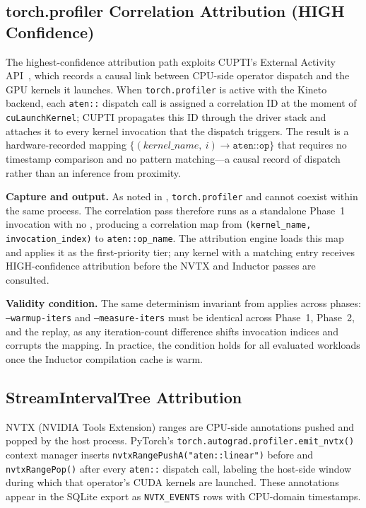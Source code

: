 \subsection{torch.profiler Correlation Attribution (HIGH Confidence)}
\label{sec:tprofiler}

The highest-confidence attribution path exploits CUPTI's External Activity API~\cite{cupti2024}, which records a
causal link between CPU-side operator dispatch and the GPU kernels it launches.  When
\texttt{torch.profiler} is active with the Kineto backend, each \texttt{aten::} dispatch call is
assigned a correlation ID at the moment of \texttt{cuLaunchKernel}; CUPTI propagates this ID
through the driver stack and attaches it to every kernel invocation that the dispatch triggers.
The result is a hardware-recorded mapping
$\{(\textit{kernel\_name},\ i) \to \texttt{aten::op}\}$ that requires no timestamp comparison
and no pattern matching---a causal record of dispatch rather than an inference from proximity.

\textbf{Capture and output.}  As noted in , \texttt{torch.profiler} and
\nsys cannot coexist within the same process.  The correlation pass therefore runs as a standalone
Phase~1 invocation with no \nsys, producing a correlation map from
\texttt{(kernel\_name, invocation\_index)} to \texttt{aten::op\_name}.
The attribution engine loads this map and applies it as the first-priority tier;
any kernel with a matching entry receives HIGH-confidence attribution before the NVTX and
Inductor passes are consulted.

\textbf{Validity condition.}  The same determinism invariant from 
applies across phases: \texttt{--warmup-iters} and \texttt{--measure-iters} must be identical
across Phase~1, Phase~2, and the \ncu replay, as any iteration-count difference shifts
invocation indices and corrupts the mapping.  In practice, the condition holds for all
evaluated workloads once the Inductor compilation cache is warm.

\subsection{StreamIntervalTree Attribution}
\label{sec:intervaltree}

NVTX (NVIDIA Tools Extension) ranges are CPU-side annotations pushed and popped by the host
process.  PyTorch's \texttt{torch.autograd.profiler.emit\_nvtx()} context manager inserts
\texttt{nvtxRangePushA(\allowbreak"aten::linear")} before and \texttt{nvtxRangePop()} after every
\texttt{aten::} dispatch call, labeling the host-side window during which that operator's CUDA
kernels are launched.  These annotations appear in the \nsys SQLite export as
\texttt{NVTX\_EVENTS} rows with CPU-domain timestamps.

